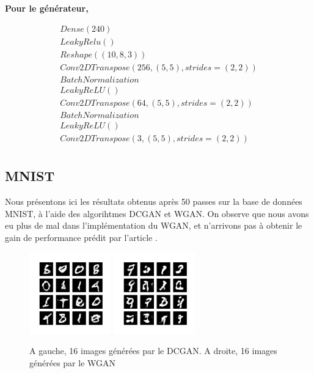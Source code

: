 \textbf{Pour le générateur,} 

\[ \begin{array}{lcr}
Dense(240)\\
LeakyRelu()\\
Reshape((10, 8, 3))\\

Conv2DTranspose(256, (5,5), strides=(2,2)) \\
BatchNormalization\\
LeakyReLU() \\


Conv2DTranspose(64, (5,5), strides=(2,2)) \\
BatchNormalization\\
LeakyReLU() \\

Conv2DTranspose(3, (5,5), strides=(2,2)) \\

\end{array}\]

\subsection{MNIST}

Nous présentons ici les résultats obtenus après 50 passes sur la base de données MNIST, à l'aide des algorihtmes DCGAN et WGAN. On observe que nous avons eu plus de mal dans l'implémentation du WGAN, et n'arrivons pas à obtenir le gain de performance prédit par l'article \cite{arjovsky_wasserstein_2017}.

\begin{figure}[!h]
\centering
\includegraphics[width=100pt]{"images/GAN/MNIST_DCGAN"}
\includegraphics[width=100pt]{"images/GAN/MNIST_WGAN"}
\caption{A gauche, 16 images générées par le DCGAN. A droite, 16 images générées par le WGAN}
\label{mnist_gan}
\end{figure}

